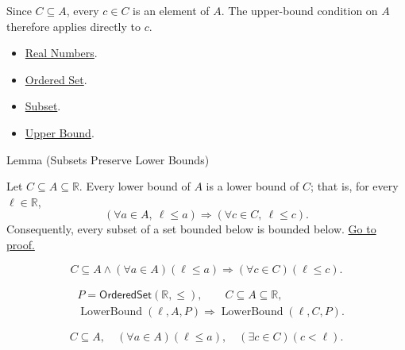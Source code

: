 \begin{remark*}[Interpretation]
Since $C\subseteq A$, every $c\in C$ is an element of $A$.  The upper-bound
condition on $A$ therefore applies directly to $c$.
\end{remark*}

\begin{dependencies}
\begin{itemize}
\item \hyperref[def:reals]{Real Numbers}.
\item \hyperref[def:ordered-set]{Ordered Set}.
\item \hyperref[def:subset]{Subset}.
\item \hyperref[def:real-upper-bound]{Upper Bound}.
\end{itemize}
\end{dependencies}

\begin{lemmabox}{Lemma (Subsets Preserve Lower Bounds)}
\begin{lemma}
\label{lem:subsets-preserve-lower-bounds}
Let $C\subseteq A\subseteq\mathbb{R}$. Every lower bound of $A$ is a
lower bound of $C$; that is, for every $\ell\in\mathbb{R}$,
\[
\left(\forall a\in A,\ \ell\leq a\right)
\Longrightarrow
(\forall c\in C,\ \ell\leq c).
\]
Consequently, every subset of a set bounded below is bounded below.
\hyperref[prf:subsets-preserve-lower-bounds]{Go to proof.}
\end{lemma}
\end{lemmabox}

\begin{remark*}
\[
C\subseteq A\land(\forall a\in A)(\ell\leq a)
\Longrightarrow
(\forall c\in C)(\ell\leq c).
\]
\end{remark*}

\begin{remark*}
\[
\begin{aligned}
&P=\mathsf{OrderedSet}(\mathbb{R},\leq),\qquad C\subseteq A\subseteq\mathbb{R},\\
&\operatorname{LowerBound}(\ell,A,P)
\Longrightarrow \operatorname{LowerBound}(\ell,C,P).
\end{aligned}
\]
\end{remark*}

\begin{remark*}
\[
C\subseteq A,\quad (\forall a\in A)(\ell\leq a),\quad
(\exists c\in C)(c<\ell).
\]
\end{remark*}

